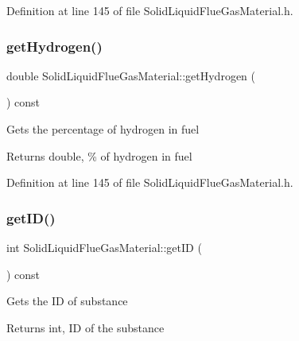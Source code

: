 Definition at line 145 of file Solid\+Liquid\+Flue\+Gas\+Material.\+h.

\mbox{\label{class_solid_liquid_flue_gas_material_a26af2edd53c50b071648d03bc6442fb6}} 
\subsubsection{\texorpdfstring{get\+Hydrogen()}{getHydrogen()}\hspace{0.1cm}{\footnotesize\ttfamily [3/3]}}
{\footnotesize\ttfamily double Solid\+Liquid\+Flue\+Gas\+Material\+::get\+Hydrogen (\begin{DoxyParamCaption}{ }\end{DoxyParamCaption}) const\hspace{0.3cm}{\ttfamily [inline]}}

Gets the percentage of hydrogen in fuel \begin{DoxyReturn}{Returns}
double, \% of hydrogen in fuel 
\end{DoxyReturn}


Definition at line 145 of file Solid\+Liquid\+Flue\+Gas\+Material.\+h.

\mbox{\label{class_solid_liquid_flue_gas_material_afb124b546137da7ba99e31616198e0c8}} 
\subsubsection{\texorpdfstring{get\+I\+D()}{getID()}\hspace{0.1cm}{\footnotesize\ttfamily [1/3]}}
{\footnotesize\ttfamily int Solid\+Liquid\+Flue\+Gas\+Material\+::get\+ID (\begin{DoxyParamCaption}{ }\end{DoxyParamCaption}) const\hspace{0.3cm}{\ttfamily [inline]}}

Gets the ID of substance \begin{DoxyReturn}{Returns}
int, ID of the substance 
\end{DoxyReturn}


